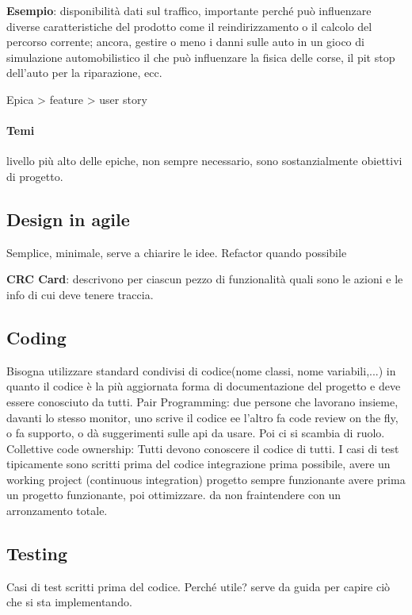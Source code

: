 \documentclass[10pt,a4paper]{book}
\begin{document}
\textbf{Esempio}: disponibilità dati sul traffico, importante perché può influenzare diverse caratteristiche del prodotto come il reindirizzamento o il calcolo del percorso corrente;
ancora, gestire o meno i danni sulle auto in un gioco di simulazione automobilistico il che può influenzare la fisica delle corse, il pit stop dell'auto per la riparazione, ecc.

Epica > feature > user story

\paragraph{Temi} livello più alto delle epiche, non sempre necessario, sono sostanzialmente obiettivi di progetto.




\subsection{Design in agile}
Semplice, minimale, serve a chiarire le idee. 
Refactor quando possibile

\textbf{CRC Card}: descrivono per ciascun pezzo di funzionalità quali sono le azioni e le info di cui deve tenere traccia.

\subsection{Coding}
Bisogna utilizzare standard condivisi di codice(nome classi, nome variabili,...) in quanto il codice è la più aggiornata forma di documentazione del progetto e deve essere conosciuto da tutti.
Pair Programming: due persone che lavorano insieme, davanti lo stesso monitor, uno scrive il codice ee l'altro fa code review on the fly, o fa supporto, o dà suggerimenti sulle api da usare. Poi ci si scambia di ruolo.
Collettive code ownership: Tutti devono conoscere il codice di tutti.
I casi di test tipicamente sono scritti prima del codice
integrazione prima possibile, avere un working project  (continuous integration) progetto sempre funzionante 
avere prima un progetto funzionante, poi ottimizzare. da non fraintendere con un arronzamento totale.

\subsection{Testing}
Casi di test scritti prima del codice. Perché utile? serve da guida per capire ciò che si sta implementando.
\end{document}
